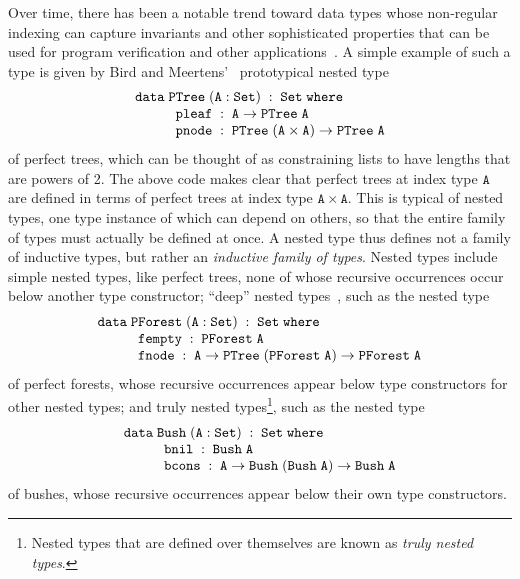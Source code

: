 \documentclass[runningheads]{llncs}
\begin{document}
Over time, there has been a notable trend toward data types whose
non-regular indexing can capture invariants and other sophisticated
properties that can be used for program verification {\color{blue} and
  other applications~\cite{}.}  A simple example of such a type is
given by Bird and Meertens'~\cite{bm98} prototypical nested type
\[\begin{array}{l}
\mathtt{data\; PTree\;(A : Set)\;:\;Set\;where}\\
\hspace*{0.4in}\mathtt{pleaf\;:\;A \rightarrow PTree\;A}\\
\hspace*{0.4in}\mathtt{pnode\;:\;PTree\;(A \times A) \rightarrow PTree\;A}
\end{array}\]
\noindent
of perfect trees, which can be thought of as constraining lists to
have lengths that are powers of 2.  The above code makes clear that
perfect trees at index type $\mathtt{A}$ are defined in terms of
perfect trees at index type $\mathtt{A \times A}$. This is typical of
nested types, one type instance of which can depend on others, so that
the entire family of types must actually be defined at once. A nested
type thus defines not a family of inductive types, but rather an {\em
  inductive family of types}.
Nested types include simple nested types, like perfect trees, none of
whose recursive occurrences occur below another type constructor;
``deep'' nested types~\cite{jp20}, such as the nested type {\small
\[\begin{array}{l}
\mathtt{data\; PForest\;(A : Set)\;:\;Set\;where}\\
\hspace*{0.4in}\mathtt{fempty\;:\;PForest\;A}\\
\hspace*{0.4in}\mathtt{fnode\;:\; A \rightarrow PTree\;(PForest\;A) \to
PForest\;A}
\end{array}\]}
\hspace{-0.04in}of perfect forests, whose recursive occurrences appear
below type constructors for other nested types; and truly nested
types\footnote{Nested types that are defined over themselves are known
  as {\em truly nested types}.}, such as the nested type {\small
\[\begin{array}{l}
\mathtt{data\; Bush\;(A : Set)\;:\;Set\;where}\\
\hspace*{0.4in}\mathtt{bnil\;:\; Bush\;A}\\
\hspace*{0.4in}\mathtt{bcons\;:\;A \rightarrow Bush\;(Bush \; A)
  \rightarrow Bush\;A} 
\end{array}\]}
\hspace{-0.04in}of bushes,
whose recursive occurrences appear below their own type constructors.
\end{document}

